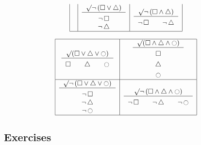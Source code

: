 \documentclass[letterpaper, 11pt]{article}
\theoremstyle{definition}
\begin{document}
{\[\begin{tabular}{|c|c|c|c|c|}
\begin{tabular}{c}
\end{tabular}
&
\begin{tabular}{c}
$\surd \neg\,(\square\vee\triangle)$\\ \hline
$\rule{0pt}{12pt}\neg\,\square$\\$\neg\,\triangle$
\end{tabular}
&
\begin{tabular}{c}
$\surd \neg\,(\square\wedge\triangle)$\\ \hline
$\rule{0pt}{12pt}\neg\,\square \quad\quad\neg\,\triangle$\\
\end{tabular}\\\hline

\end{tabular}\]

\[\begin{tabular}{|c|c|c|c|c|}
\hline
\begin{tabular}{c}
$\surd (\square\vee\triangle\vee\Circle)$\\ \hline
$\rule{0pt}{12pt}\square \quad\quad \triangle \quad\quad\Circle$
\end{tabular}
&
\begin{tabular}{c}
$\surd (\square\wedge\triangle\wedge\Circle)$\\ \hline
$\rule{0pt}{12pt}\square$\\
$\rule{0pt}{12pt}\triangle$\\
$\rule{0pt}{12pt}\Circle$\\
\end{tabular}
\\\hline %
\begin{tabular}{c}
$\surd \neg\,(\square\vee\triangle\vee\Circle)$\\ \hline
$\rule{0pt}{12pt}\neg\,\square$\\$\neg\,\triangle$\\$\neg\,\Circle$
\end{tabular}
&
\begin{tabular}{c}
$\surd \neg\,(\square\wedge\triangle\wedge\Circle)$\\ \hline
$\rule{0pt}{12pt}\neg\,\square\quad\quad\neg\,\triangle\quad\quad\neg\,\Circle$\\
\end{tabular}\\\hline

\end{tabular}\]
}

\subsection{Exercises}
\end{document}
